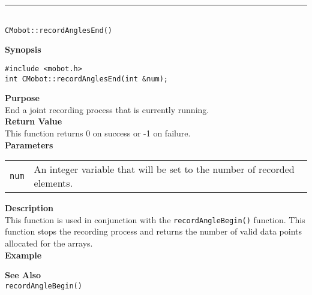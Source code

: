 \noindent
\vspace{5pt}
\rule{4.5in}{0.015in}\\
\noindent
{\LARGE \texttt{CMobot::recordAnglesEnd()}}\\
{}

\noindent
{\bf Synopsis}
\vspace{-8pt}
\begin{verbatim}
#include <mobot.h>
int CMobot::recordAnglesEnd(int &num);
\end{verbatim}

\noindent
{\bf Purpose}\\
End a joint recording process that is currently running.\\

\noindent
{\bf Return Value}\\
This function returns 0 on success or -1 on failure.\\

\noindent
{\bf Parameters}\\
\vspace{-0.1in}
\begin{description}
\item               
\begin{tabular}{p{15 mm}p{145 mm}}
\texttt{num} & An integer variable that will be set to the number of recorded elements. \\
\end{tabular}
\end{description}

\noindent
{\bf Description}\\
This function is used in conjunction with the \texttt{recordAngleBegin()} function. 
This function stops the recording process and returns the number of valid data points
allocated for the arrays.\\

\noindent
{\bf Example}\\
\noindent

\noindent
{\bf See Also}\\
\texttt{recordAngleBegin()} \\
